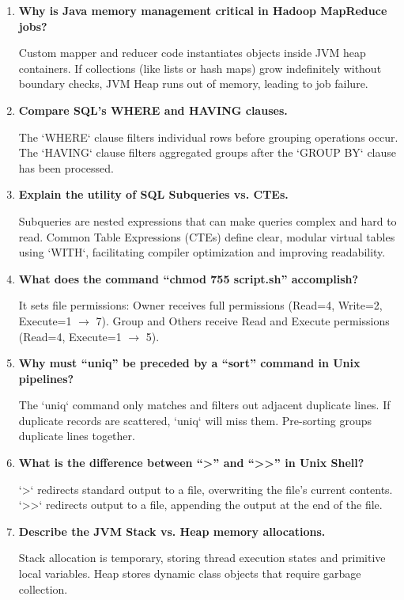 \documentclass[12pt,a4paper]{article}
\newcommand{\Q}[1]{\textbf{#1}\par\noindent\ignorespaces}
\begin{document}
\vspace{6pt}

\begin{tcolorbox}[exambox, title={\textbf{Frequently Asked / Viva Questions}}]
\begin{enumerate}[leftmargin=*, topsep=0pt, label=\textbf{Q\arabic*.}, itemsep=5pt]
  \item \Q{Why is Java memory management critical in Hadoop MapReduce jobs?}
        Custom mapper and reducer code instantiates objects inside JVM heap containers. If collections (like lists or hash maps) grow indefinitely without boundary checks, JVM Heap runs out of memory, leading to job failure.
        
  \item \Q{Compare SQL's WHERE and HAVING clauses.}
        The `WHERE` clause filters individual rows before grouping operations occur. The `HAVING` clause filters aggregated groups after the `GROUP BY` clause has been processed.
        
  \item \Q{Explain the utility of SQL Subqueries vs. CTEs.}
        Subqueries are nested expressions that can make queries complex and hard to read. Common Table Expressions (CTEs) define clear, modular virtual tables using `WITH`, facilitating compiler optimization and improving readability.
        
  \item \Q{What does the command ``chmod 755 script.sh'' accomplish?}
        It sets file permissions: Owner receives full permissions (Read=4, Write=2, Execute=1 $\to$ 7). Group and Others receive Read and Execute permissions (Read=4, Execute=1 $\to$ 5).
        
  \item \Q{Why must ``uniq'' be preceded by a ``sort'' command in Unix pipelines?}
        The `uniq` command only matches and filters out adjacent duplicate lines. If duplicate records are scattered, `uniq` will miss them. Pre-sorting groups duplicate lines together.
        
  \item \Q{What is the difference between ``>'' and ``>>'' in Unix Shell?}
        `>` redirects standard output to a file, overwriting the file's current contents. `>>` redirects output to a file, appending the output at the end of the file.
        
  \item \Q{Describe the JVM Stack vs. Heap memory allocations.}
        Stack allocation is temporary, storing thread execution states and primitive local variables. Heap stores dynamic class objects that require garbage collection.
        

\end{enumerate}
\end{tcolorbox}
\end{document}
